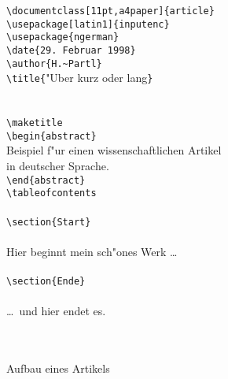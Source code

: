 \begin{figure}[hbtp] %
\oben{10cm}
\begin{flushleft}\ttfamily
\verb+\documentclass[11pt,a4paper]{article}+\\
\verb+\usepackage[latin1]{inputenc}+\\
\verb+\usepackage{ngerman}+\\
\verb+\date{29. Februar 1998}+\\
\verb+\author{H.~Partl}+\\
\verb+\title{+"Uber kurz oder lang\verb+}+\\
\ \\
\verb++\\
\verb+\maketitle+\\
\verb+\begin{abstract}+\\
Beispiel f"ur einen wissenschaftlichen Artikel\\
in deutscher Sprache.\\
\verb+\end{abstract}+\\
\verb+\tableofcontents+\\
\ \\
\verb+\section{Start}+\\
\ \\
Hier beginnt mein sch"ones Werk \dots\\
\ \\
\verb+\section{Ende}+\\
\ \\
\dots\ und hier endet es.\\
\ \\
\verb++\\[1\baselineskip]
\end{flushleft}
\unten
\caption{Aufbau eines Artikels} \label{dokument}
\end{figure}
 
